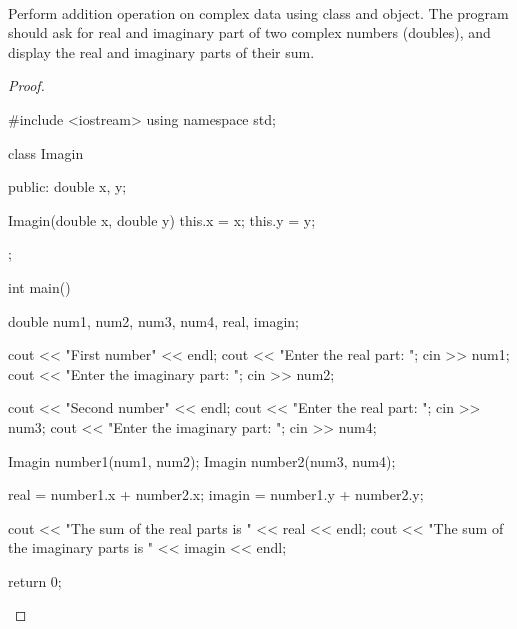 \documentclass[12pt]{article}
\newenvironment{problem}[2][Problem]{\begin{trivlist}
\item[\hskip \labelsep {\bfseries #1}\hskip \labelsep {\bfseries #2.}]}{\end{trivlist}}
\begin{document}

\begin{problem}{4}
\text{ }\\
Perform addition operation on complex data using class and object. The program should ask for real and imaginary part of two complex numbers (doubles), and display the real and imaginary parts of their sum.
\end{problem}

\begin{proof}
\begin{cppcode}[]
#include <iostream>
using namespace std;

class Imagin
{
	public:
    	double x, y;

    	Imagin(double x, double y)
        {
    	    this.x = x;
            this.y = y;
        }
};

int main()
{
	double num1, num2, num3, num4, real, imagin;

	cout << "First number" << endl;
	cout << "Enter the real part: ";
	cin >> num1;
	cout << "Enter the imaginary part: ";
	cin >> num2;

    cout << "Second number" << endl;
	cout << "Enter the real part: ";
	cin >> num3;
	cout << "Enter the imaginary part: ";
	cin >> num4;

	Imagin number1(num1, num2);
	Imagin number2(num3, num4);

    real = number1.x + number2.x;
    imagin = number1.y + number2.y;

    cout << "The sum of the real parts is " << real << endl;
    cout << "The sum of the imaginary parts is " << imagin << endl;

    return 0;
}
\end{cppcode}
\end{proof}

\end{document}
